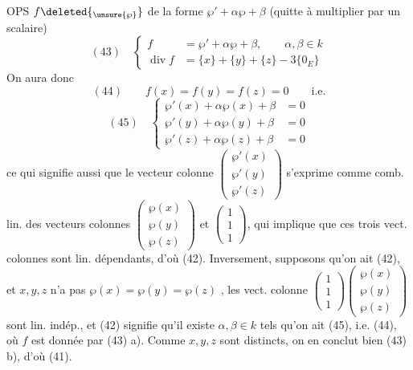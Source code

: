 OPS $f\deleted{_{\unsure{\wp}}}$ de la forme $\wp'+\alpha\wp+\beta$
(quitte à multiplier par un scalaire)
\[
(43)\quad\left\{\begin{aligned}
f&=\wp'+\alpha\wp+\beta,\qquad\alpha,\beta\in k\\
\operatorname{div}f&=\{x\}+\{y\}+\{z\}-3\{0_E\}
\end{aligned}\right.
\]
On aura donc
\[
(44)\qquad f(x)=f(y)=f(z)=0\qquad\text{i.e.}
\]
\[
(45)\quad\left\{\begin{aligned}
\wp'(x)+\alpha\wp(x)+\beta&=0\\
\wp'(y)+\alpha\wp(y)+\beta&=0\\
\wp'(z)+\alpha\wp(z)+\beta&=0
\end{aligned}\right.
\]
ce qui signifie aussi que le vecteur colonne
$\begin{pmatrix}\wp'(x)\\\wp'(y)\\\wp'(z)\end{pmatrix}$
s'exprime comme comb. lin. des vecteurs colonnes
$\begin{pmatrix}\wp(x)\\\wp(y)\\\wp(z)\end{pmatrix}$ et
$\begin{pmatrix}1\\1\\1\end{pmatrix}$,  qui implique que ces trois
vect. colonnes sont lin. dépendants, d'où (42).
Inversement, supposons qu'on ait (42), et $x,y,z$ 
  
n'a pas $\wp(x)=\wp(y)=\wp(z)$ 
, 
les vect. colonne
$\begin{pmatrix}1\\1\\1\end{pmatrix}\begin{pmatrix}\wp(x)\\\wp(y)\\\wp(z)\end{pmatrix}$
sont lin. indép., et (42) signifie qu'il existe $\alpha,\beta\in k$ tels qu'on ait
(45), i.e. (44), où $f$ est donnée par (43) a).
Comme $x,y,z$ sont distincts, on en conclut bien (43) b), d'où (41).


